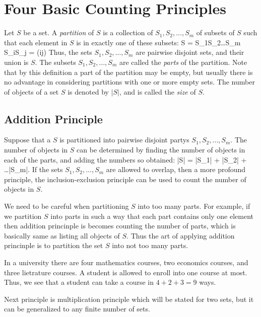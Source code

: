 \section{Four Basic Counting Principles}
Let $S$ be a set. A {\it partition} of $S$ is a collection of $S_1, S_2, \ldots, S_m$ of subsets of $S$ such that each element
in $S$ is in exactly one of these subsets:
\startformula S = S_1\cup S_2\cup\ldots\cup S_m\stopformula
\startformula S_i\cap S_j = \phi(i\neq j)\stopformula
Thus, the sets $S_1, S_2, \ldots, S_m$ are pairwise disjoint sets, and their union is $S$. The subsets $S_1, S_2, \ldots, S_m$ are
called the {\it parts} of the partition. Note that by this definition a part of the partition may be empty, but usually there is
no advantage in considering partitions with one or more empty sets. The number of objects of a set $S$ is denoted by $|S|$, and is
called the {\it size} of $S$.

\subsection{Addition Principle}
Suppose that a $S$ is partitioned into pairwise disjoint partys $S_1, S_2, \ldots, S_m$. The number of objects in $S$ can be
determined by finding the number of objects in each of the parts, and adding the numbers so obtained:
\startformula |S| = |S_1| + |S_2| + \ldots |S_m|.\stopformula
If the sets $S_1, S_2, \ldots, S_m$ are allowed to overlap, then a more profound principle, the inclusion-exclusion principle can
be used to count the number of objects in $S$.

We need to be careful when partitioning $S$ into too many parts. For example, if we partition $S$ into parts in such a way that
each part contains only one element then addition princinple is becomes counting the number of parts, which is basically same as
listing all objects of $S$. Thus the art of applying addition princinple is to partition the set $S$ into not too many parts.

 In a university there are four mathematics courses, two economics courses, and three lietrature
courses. A student is allowed to enroll into one course at most. Thus, we see that a student can take a course in $4 + 2 + 3 = 9$
ways.

Next principle is multiplication principle which will be stated for two sets, but it can be generalized to any finite number of
sets.


